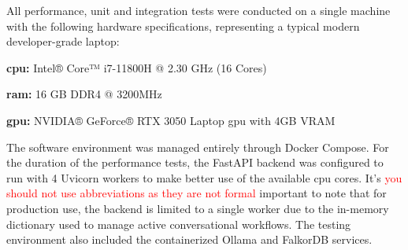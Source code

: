 All performance, unit and integration tests were conducted on a single machine with the following hardware specifications, representing a typical modern developer-grade laptop:
\begin{compactitem}[\textbullet]
    \item \textbf{\acs{cpu}:} Intel® Core™ i7-11800H @ 2.30 GHz (16 Cores)
    \item \textbf{\acs{ram}:} 16 GB DDR4 @ 3200MHz
    \item \textbf{\acs{gpu}:} NVIDIA® GeForce® RTX 3050 Laptop \acs{gpu} with 4GB VRAM
\end{compactitem}

The software environment was managed entirely through Docker Compose. For the duration of the performance tests, the FastAPI backend was configured to run with 4 Uvicorn workers to make better use of the available \acs{cpu} cores. 
It's \textcolor{red}{you should not use abbreviations as they are not formal}
important to note that for production use, the backend is limited to a single worker due to the in-memory dictionary used to manage active conversational workflows. The testing environment also included the containerized Ollama and FalkorDB services.

